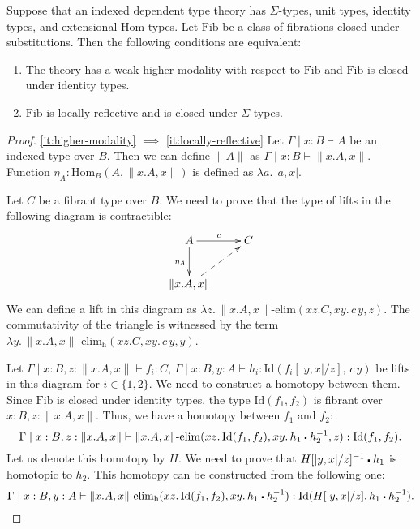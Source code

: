 \documentclass[reqno]{mscs}
\newcommand{\ob}{}
\newcommand{\fs}[1]{\mathrm{#1}}
\newcommand{\Hom}{\fs{Hom}}
\newcommand{\Id}{\fs{Id}}
\newcommand{\sym}[1]{#1^{-1}}
\newcommand{\Fib}{\fs{Fib}}
\numberwithin{figure}{section}
\newcommand{\ct}{%
  \mathchoice{\mathbin{\raisebox{0.25ex}{$\displaystyle\centerdot$}}}%
             {\mathbin{\raisebox{0.25ex}{$\centerdot$}}}%
             {\mathbin{\raisebox{0.25ex}{$\scriptstyle\,\centerdot\,$}}}%
             {\mathbin{\raisebox{0.25ex}{$\scriptscriptstyle\,\centerdot\,$}}}
}
\begin{document}
\begin{prop}
Suppose that an indexed dependent type theory has $\Sigma$-types, unit types, identity types, and extensional $\Hom$-types.
Let $\Fib$ be a class of fibrations closed under substitutions.
Then the following conditions are equivalent:
\begin{enumerate}
\item \label{it:higher-modality} The theory has a weak higher modality with respect to $\Fib$ and $\Fib$ is closed under identity types.
\item \label{it:locally-reflective} $\Fib$ is locally reflective and is closed under $\Sigma$-types.
\end{enumerate}
\end{prop}
\begin{proof}
\eqref{it:higher-modality} $\implies$ \eqref{it:locally-reflective}
Let $\Gamma \mid x : B \vdash A \ob$ be an indexed type over $B$.
Then we can define $\| A \|$ as $\Gamma \mid x : B \vdash \| x.A, x \|$.
Function $\eta_A : \Hom_B(A, \| x.A, x \|)$ is defined as $\lambda a.\,| a, x |$.

Let $C$ be a fibrant type over $B$.
We need to prove that the type of lifts in the following diagram is contractible:
\[ \xymatrix{ A \ar[r]^c \ar[d]_{\eta_A} & C \\
              \| x.A, x \| \ar@{-->}[ur]
            } \]
We can define a lift in this diagram as $\lambda z.\,\| x.A, x \|\text{-}\fs{elim}(x z. C, x y.\,c\,y, z)$.
The commutativity of the triangle is witnessed by the term $\lambda y.\,\| x.A, x \|\text{-}\fs{elim_h}(x z. C, x y.\,c\,y, y)$.

Let $\Gamma \mid x : B, z : \| x.A, x \| \vdash f_i : C$, $\Gamma \mid x : B, y : A \vdash h_i : \Id(f_i[|y,x|/z],\,c\,y)$ be lifts in this diagram for $i \in \{1,2\}$.
We need to construct a homotopy between them.
Since $\Fib$ is closed under identity types, the type $\Id(f_1,f_2)$ is fibrant over $x : B, z : \| x.A, x \|$.
Thus, we have a homotopy between $f_1$ and $f_2$:
\[ \Gamma \mid x : B, z : \| x.A, x \| \vdash \| x.A, x \|\text{-}\fs{elim}(x z.\,\Id(f_1,f_2), x y.\,h_1 \ct \sym{h_2}, z) : \Id(f_1, f_2). \]
Let us denote this homotopy by $H$.
We need to prove that $\sym{H[|y,x|/z]} \ct h_1$ is homotopic to $h_2$.
This homotopy can be constructed from the following one:
\[ \Gamma \mid x : B, y : A \vdash \| x.A, x \|\text{-}\fs{elim_h}(x z.\,\Id(f_1,f_2), x y.\,h_1 \ct \sym{h_2}) : \Id(H[|y,x|/z], h_1 \ct \sym{h_2}). \]


\end{proof}
\end{document}
